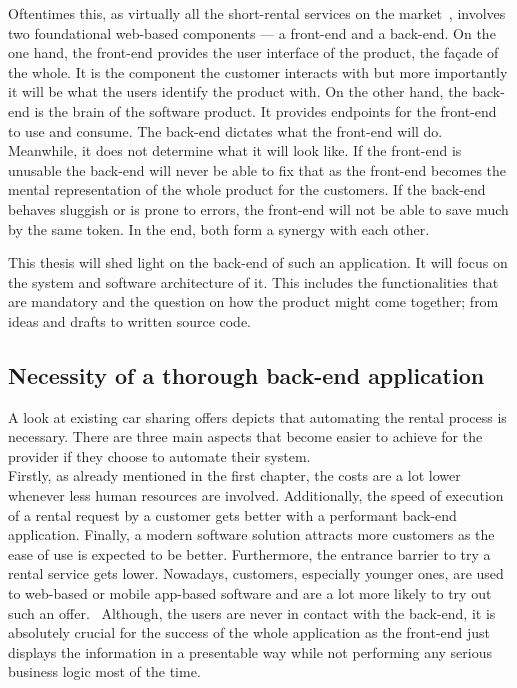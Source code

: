 \documentclass[12pt,a4paper]{report}
\begin{document}
Oftentimes this, as virtually all the short-rental services on the market~\cn,
involves two foundational web-based components --- a front-end and a back-end\cn.
On the one hand, the front-end provides the user interface of the product, the façade of the whole.
It is the component the customer interacts with but more importantly it will be
what the users identify the product with.
On the other hand, the back-end is the brain of the software product.
It provides endpoints for the front-end to use and consume. The back-end dictates
what the front-end will do. Meanwhile, it does not determine what it will look like.
If the front-end is unusable the back-end will never be able to fix that as the
front-end becomes the mental representation of the whole product for the customers.
If the back-end behaves sluggish or is prone to errors, the front-end will not be able to save much
by the same token. In the end, both form a synergy with each other.

This thesis will shed light on the back-end of such an application.
It will focus on the system and software architecture of it.
This includes the functionalities that are mandatory and the question on
how the product might come together; from ideas and drafts to written source code.


\subsection{Necessity of a thorough back-end application}

A look at existing car sharing offers depicts that automating the rental process
is necessary. There are three main aspects that become easier to achieve for the
provider if they choose to automate their system.\\
Firstly, as already mentioned in the first chapter,
the costs are a lot lower whenever less human resources are involved.
Additionally, the speed of execution of a rental request by a customer gets better
with a performant back-end application.
Finally, a modern software solution attracts more customers as the ease of use
is expected to be better. Furthermore, the entrance barrier to try a rental service
gets lower. Nowadays, customers, especially younger ones, are used to web-based
or mobile app-based software and are a lot more likely to try out such an offer.~\cn
Although, the users are never in contact with the back-end, it is absolutely
crucial for the success of the whole application as the front-end just displays
the information in a presentable way while not performing any serious
business logic most of the time.
\end{document}

